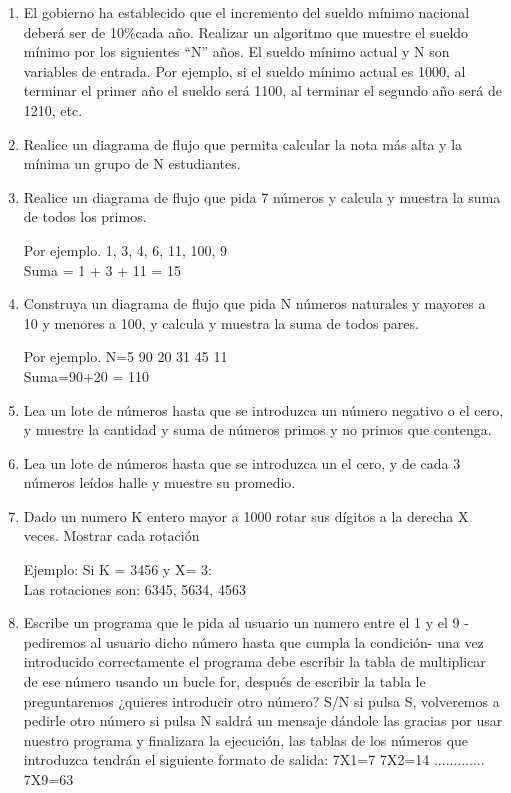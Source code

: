\documentclass{scrartcl}
\begin{document}
\begin{enumerate}
		\item El gobierno ha establecido que el incremento del sueldo mínimo nacional deberá ser de 10\%cada año. Realizar un algoritmo que muestre el sueldo mínimo por los siguientes “N” años. El sueldo mínimo actual y N son variables de entrada.	Por ejemplo, si el sueldo mínimo actual es 1000, al terminar el primer año el sueldo será 1100, al terminar el segundo año será de 1210, etc.
		
		\item Realice un diagrama de flujo que permita calcular la nota más alta y la mínima un grupo de N estudiantes.
		
		\item Realice un diagrama de flujo que pida 7 números y calcula y muestra la suma de todos los primos.
		
		Por ejemplo. 1, 3, 4, 6, 11, 100, 9 \\
		Suma = 1 + 3 + 11 = 15
		
		\item Construya un diagrama de flujo que pida N números naturales y mayores a 10 y menores a 100, y calcula y muestra la suma de todos pares.
		
		Por ejemplo. N=5 90 20 31 45 11 \\
		Suma=90+20 = 110
		
		\item Lea un lote de números hasta que se introduzca un número negativo o el cero, y muestre la cantidad y suma de números primos y no primos que contenga.
		
		\item Lea un lote de números hasta que se introduzca un el cero, y de cada 3 números leídos halle y muestre su promedio.
		
		\item Dado un numero K entero mayor a 1000 rotar sus dígitos a la derecha X veces. Mostrar cada rotación
		
		Ejemplo:  Si K = 3456 y X= 3: \\
		Las rotaciones son: 6345, 5634, 4563
		
		\item Escribe un programa que le pida al usuario un numero entre el 1 y el 9 - pediremos al usuario dicho número hasta que cumpla la condición- una vez introducido	correctamente el programa debe escribir la tabla de multiplicar de ese número usando un bucle for, después de escribir la tabla le preguntaremos ¿quieres introducir otro número? S/N si pulsa S, volveremos a pedirle otro número si pulsa N saldrá un mensaje dándole las gracias por usar nuestro programa y finalizara la ejecución, las tablas de los números que introduzca tendrán el siguiente formato de	salida: 7X1=7 7X2=14 ............. 7X9=63
		

\end{enumerate}
\end{document}

